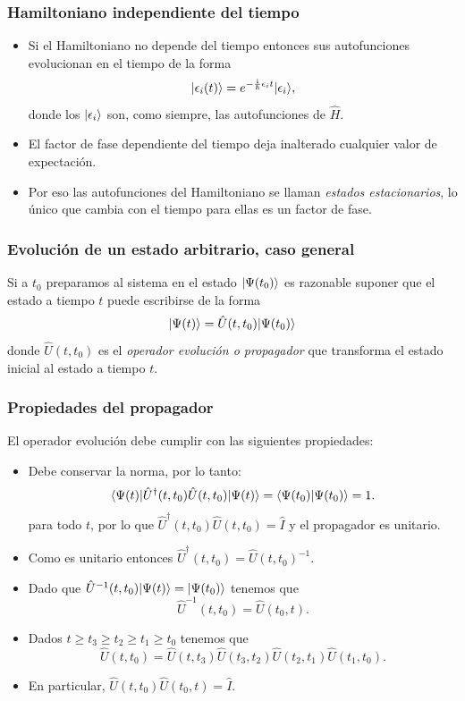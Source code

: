 \documentclass{beamer}
\begin{document}
\begin{frame}
    \frametitle{Hamiltoniano independiente del tiempo}

    \begin{itemize}
        \item Si el Hamiltoniano no depende del tiempo entonces sus autofunciones evolucionan en el tiempo de la forma
        \[ | \epsilon_i(t) \rangle = e^{-\frac{\mathrm{i}}{\hbar}\epsilon_i t}| \epsilon_i \rangle, \] 
        donde los $| \epsilon_i \rangle$ son, como siempre, las autofunciones de $\hat{H}$.
        \item El factor de fase dependiente del tiempo deja inalterado cualquier valor de expectación.
        \item Por eso las autofunciones del Hamiltoniano se llaman {\em estados estacionarios}, lo único que cambia con el tiempo para ellas es un factor de fase.
    \end{itemize}
    
\end{frame}

\begin{frame}
    \frametitle{Evolución de un estado arbitrario, caso general}

    Si a $t_0$ preparamos al sistema en el estado $| \Psi(t_0) \rangle$ es razonable suponer que el estado a tiempo $t$ puede escribirse de la forma
    \[ | \Psi(t) \rangle = \hat{U}(t,t_0) | \Psi(t_0) \rangle \]
    donde $\hat{U}(t,t_0)$ es el {\em operador evolución o propagador} que transforma el estado inicial al estado a tiempo $t$. 

    
\end{frame}

\begin{frame}
    \frametitle{Propiedades del propagador}

El operador evolución debe cumplir con las siguientes propiedades:

    \begin{itemize}
        \item Debe conservar la norma, por lo tanto:
        \[\langle \Psi(t) | \hat{U}^\dagger(t,t_0) \hat{U}(t,t_0) | \Psi(t) \rangle =
        \langle \Psi(t_0) | \Psi(t_0) \rangle = 1. \] 
        para todo $t$, por lo que $\hat{U}^\dagger(t,t_0) \hat{U}(t,t_0) = \hat{I}$ y el propagador es unitario.
        \item Como es unitario entonces $\hat{U}^\dagger(t,t_0) = \hat{U}(t,t_0)^{-1}$.
        \item Dado que $\hat{U}^{-1}(t,t_0) | \Psi(t) \rangle = | \Psi(t_0) \rangle$ tenemos que
        \[ \hat{U}^{-1}(t,t_0) = \hat{U}(t_0,t). \]
        \item Dados $t\geq t_3 \geq t_2 \geq t_1 \geq t_0$ tenemos que
        \[ \hat{U}(t,t_0) = \hat{U}(t,t_3)\hat{U}(t_3,t_2)\hat{U}(t_2,t_1)\hat{U}(t_1,t_0).\]
        \item En particular, $\hat{U}(t,t_0)\hat{U}(t_0,t)=\hat{I}$.
    \end{itemize}

\end{frame}
\end{document}
